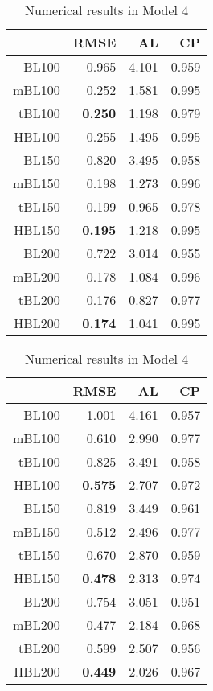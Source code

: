 \documentclass[11pt]{article}
\theoremstyle{plain}
\theoremstyle{definition}
\begin{document}
\begin{table}[h]
  \begin{minipage}[t]{.45\textwidth}
  \caption{Numerical results in Model 3}
    \begin{center}
      \begin{tabular}{rrrr}
  \hline
 & RMSE  & AL & CP  \\ 
  \hline
BL100 & 0.965  & 4.101 & 0.959  \\ 
  mBL100 & 0.252  & 1.581 & 0.995  \\ 
  tBL100 & {\bf 0.250}  & 1.198 & 0.979  \\ 
  HBL100 & 0.255  & 1.495 & 0.995  \\ \hline
  BL150 & 0.820  & 3.495 & 0.958  \\ 
  mBL150 & 0.198  & 1.273 & 0.996  \\ 
  tBL150 & 0.199  & 0.965 & 0.978  \\ 
  HBL150 & {\bf 0.195}  & 1.218 & 0.995  \\ \hline
  BL200 & 0.722  & 3.014 & 0.955  \\ 
  mBL200 & 0.178  & 1.084 & 0.996  \\ 
  tBL200 & 0.176  & 0.827 & 0.977  \\ 
  HBL200 &{\bf  0.174}  & 1.041 & 0.995  \\ 
   \hline
      \end{tabular}
    \end{center}
    \label{tab:model3}
  \end{minipage}
  \hfill
  \begin{minipage}[t]{.45\textwidth}
  \caption{Numerical results in Model 4}
    \begin{center}
      \begin{tabular}{rrrr}
  \hline
 & RMSE  & AL & CP  \\ 
  \hline
BL100 & 1.001  & 4.161 & 0.957  \\ 
  mBL100 & 0.610  & 2.990 & 0.977  \\ 
  tBL100 & 0.825 & 3.491 & 0.958  \\ 
  HBL100 & {\bf 0.575}  & 2.707 & 0.972  \\ \hline
  BL150 & 0.819 & 3.449 & 0.961  \\ 
  mBL150 & 0.512  & 2.496 & 0.977  \\ 
  tBL150 & 0.670  & 2.870 & 0.959  \\ 
  HBL150 & {\bf 0.478}  & 2.313 & 0.974  \\ \hline
  BL200 & 0.754  & 3.051 & 0.951  \\ 
  mBL200 & 0.477  & 2.184 & 0.968  \\ 
  tBL200 & 0.599  & 2.507 & 0.956  \\ 
  HBL200 & {\bf 0.449}  & 2.026 & 0.967  \\ 
   \hline      
      \end{tabular}
    \end{center}
    \label{tab:model4}
  \end{minipage}
\end{table}
\end{document}
